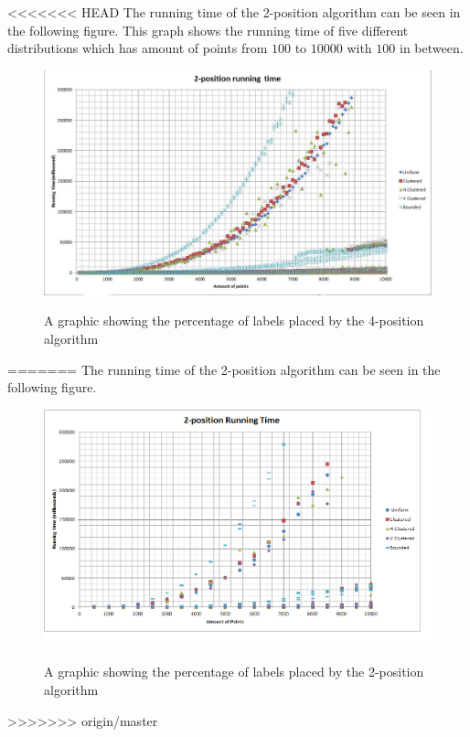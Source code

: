 \documentclass[crop=false,a4paper,oneside,11pt]{standalone}
\begin{document}
<<<<<<< HEAD
The running time of the 2-position algorithm can be seen in the following figure. This graph shows the running time of five different distributions which has amount of points from $100$ to $10000$ with $100$ in between.
\begin{figure}[h!]
 \centering
  \includegraphics[scale = 0.5]{2PosRunningTime.JPG}\\
  \caption{A graphic showing the percentage of labels placed by the 4-position algorithm}
 \end{figure}  
=======
The running time of the 2-position algorithm can be seen in the following figure.
\begin{figure}[h!]
 \centering
  \includegraphics[scale = 0.5]{2PosRunningTime.png}\\
  \caption{A graphic showing the percentage of labels placed by the 2-position algorithm}
 \end{figure}
>>>>>>> origin/master
\end{document}
